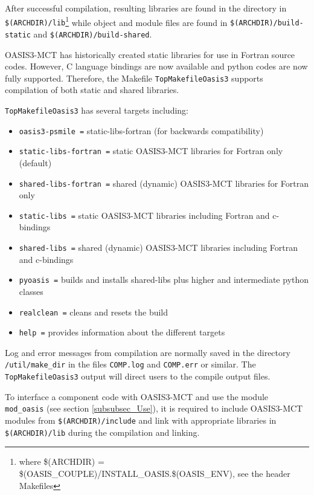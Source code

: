 After successful compilation, resulting
libraries are found in the directory in {\tt \$(ARCHDIR)/lib}\footnote{where \$(ARCHDIR) = \$(OASIS\_COUPLE)/INSTALL\_OASIS.\$(OASIS\_ENV), see the header Makefiles} while
object and module files are found in {\tt \$(ARCHDIR)/build-static} and {\tt \$(ARCHDIR)/build-shared}. 

OASIS3-MCT has historically created static libraries for use in
Fortran source codes.  However, C language bindings are now
available and python codes are now fully supported. Therefore, the Makefile {\tt TopMakefileOasis3}
supports compilation of both static and shared libraries.

{\tt TopMakefileOasis3} has several targets including:

\begin{itemize}
\item  {\tt oasis3-psmile       =} static-libs-fortran (for backwards compatibility)
\item  {\tt static-libs-fortran =} static OASIS3-MCT libraries for Fortran only (default)
\item  {\tt shared-libs-fortran =} shared (dynamic) OASIS3-MCT libraries for Fortran only
\item  {\tt static-libs         =} static OASIS3-MCT libraries including Fortran and c-bindings
\item  {\tt shared-libs         =} shared (dynamic) OASIS3-MCT libraries including Fortran and c-bindings
\item  {\tt pyoasis             =} builds and installs shared-libs plus higher and intermediate python classes
\item  {\tt realclean           =} cleans and resets the build
\item  {\tt help                =} provides information about the different targets               
\end{itemize}

Log and error messages from compilation are normally saved in the directory
{\tt /util/make\_dir} in the files
{\tt COMP.log} and {\tt COMP.err} or similar.  The {\tt TopMakefileOasis3}
output will direct users to the compile output files.

To interface a component code with OASIS3-MCT and use the module {\tt mod\_oasis} (see section \ref{subsubsec_Use}), it is required to include OASIS3-MCT modules from {\tt \$(ARCHDIR)/include} and link with appropriate libraries in {\tt \$(ARCHDIR)/lib} during the compilation and linking.

